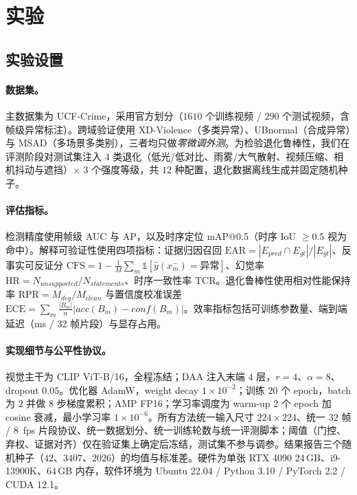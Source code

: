 \section{实验}
\label{sec:exp}

\subsection{实验设置}

\paragraph{数据集。} 主数据集为 UCF-Crime，采用官方划分（$1610$ 个训练视频 / $290$ 个测试视频，含帧级异常标注）。跨域验证使用 XD-Violence（多类异常）、UBnormal（合成异常）与 MSAD（多场景多类别），三者均只做\emph{零微调外测}。为检验退化鲁棒性，我们在评测阶段对测试集注入 $4$ 类退化（低光/低对比、雨雾/大气散射、视频压缩、相机抖动与遮挡）$\times$ $3$ 个强度等级，共 $12$ 种配置，退化数据离线生成并固定随机种子。

\paragraph{评估指标。} 检测精度使用帧级 AUC 与 AP，以及时序定位 mAP@0.5（时序 IoU $\geq 0.5$ 视为命中）。解释可验证性使用四项指标：证据归因召回 $\mathrm{EAR} = |E_{pred} \cap E_{gt}| / |E_{gt}|$、反事实可反证分 $\mathrm{CFS} = 1 - \frac{1}{M}\sum_m \mathbb{1}[\hat{y}(x_m^{-}) = \text{异常}]$、幻觉率 $\mathrm{HR} = N_{unsupported}/N_{statements}$、时序一致性率 $\mathrm{TCR}$。退化鲁棒性使用相对性能保持率 $\mathrm{RPR} = M_{deg}/M_{clean}$ 与置信度校准误差 $\mathrm{ECE} = \sum_m \frac{|B_m|}{n}|acc(B_m) - conf(B_m)|$。效率指标包括可训练参数量、端到端延迟（ms / 32 帧片段）与显存占用。

\paragraph{实现细节与公平性协议。} 视觉主干为 CLIP ViT-B/16，全程冻结；DAA 注入末端 $4$ 层，$r{=}4$、$\alpha{=}8$、dropout $0.05$。优化器 AdamW，weight decay $1\times10^{-2}$；训练 $20$ 个 epoch，batch 为 $2$ 并做 $8$ 步梯度累积；AMP FP16；学习率调度为 warm-up $2$ 个 epoch 加 cosine 衰减，最小学习率 $1\times10^{-6}$。所有方法统一输入尺寸 $224\times224$、统一 $32$ 帧 / $8$~fps 片段协议、统一数据划分、统一训练轮数与统一评测脚本；阈值（门控、弃权、证据对齐）仅在验证集上确定后冻结，测试集不参与调参。结果报告三个随机种子（$42$、$3407$、$2026$）的均值与标准差。硬件为单张 RTX 4090 24\,GB、i9-13900K、64\,GB 内存，软件环境为 Ubuntu 22.04 / Python 3.10 / PyTorch 2.2 / CUDA 12.1。

